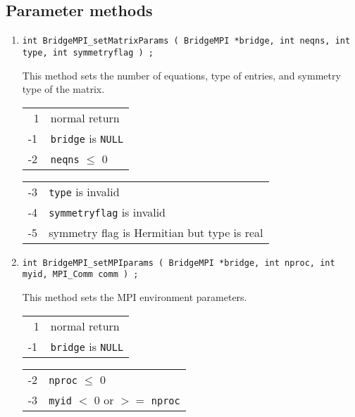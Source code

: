 \subsection{Parameter methods}
\label{subsection:BridgeMPI:proto:parameters}
\par
\begin{enumerate}
\item
\begin{verbatim}
int BridgeMPI_setMatrixParams ( BridgeMPI *bridge, int neqns, int type, int symmetryflag ) ;
\end{verbatim}
This method sets the number of equations, type of entries, 
and symmetry type of the matrix.
\par {}
\begin{center}
\begin{tabular}{ll}
~1 & normal return \\
-1 & \texttt{bridge} is \texttt{NULL} \\
-2 & \texttt{neqns} $\le$ 0
\end{tabular}
\begin{tabular}{ll}
-3 & \texttt{type} is invalid \\
-4 & \texttt{symmetryflag} is invalid \\
-5 & symmetry flag is Hermitian but type is real
\end{tabular}
\end{center}
\item
\begin{verbatim}
int BridgeMPI_setMPIparams ( BridgeMPI *bridge, int nproc, int myid, MPI_Comm comm ) ;
\end{verbatim}
This method sets the MPI environment parameters.
\par {}
\begin{center}
\begin{tabular}{ll}
~1 & normal return \\
-1 & \texttt{bridge} is \texttt{NULL}
\end{tabular}
\begin{tabular}{ll}
-2 & \texttt{nproc} $\le$ 0 \\
-3 & \texttt{myid} $<$ 0 or $>=$ \texttt{nproc}

\end{tabular}
\end{center}
\end{enumerate}
